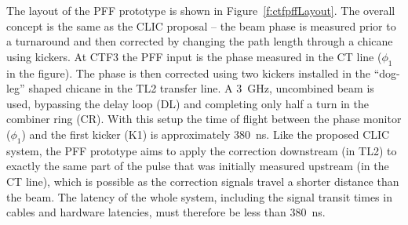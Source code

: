 The layout of the PFF prototype is shown in Figure~\ref{f:ctfpffLayout}. The overall concept is the same as the CLIC proposal -- the beam phase is measured prior to a turnaround and then corrected by changing the path length through a chicane using kickers. At CTF3 the PFF input is the phase measured in the CT line (\(\phi_1\) in the figure). The phase is then corrected using two kickers installed in the ``dog-leg'' shaped chicane in the TL2 transfer line.  A 3~GHz, uncombined beam is used, bypassing the delay loop (DL) and completing only half a turn in the combiner ring (CR). With this setup the time of flight between the phase monitor (\(\phi_1\)) and the first kicker (K1) is approximately 380~ns. Like the proposed CLIC system, the PFF prototype aims to apply the correction downstream (in TL2) to exactly the same part of the pulse that was initially measured upstream (in the CT line), which is possible as the correction signals travel a shorter distance than the beam. The latency of the whole system, including the signal transit times in cables and hardware latencies, must therefore be less than 380~ns.


